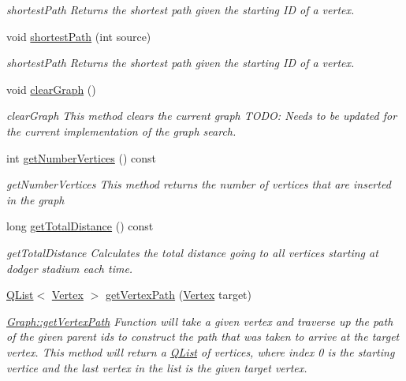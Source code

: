 \begin{DoxyCompactItemize}
\begin{DoxyCompactList}\small\item\em shortest\+Path Returns the shortest path given the starting ID of a vertex. \end{DoxyCompactList}\item 
void \hyperlink{class_graph_a6fc020710dd252058c006961f33f2b4b}{shortest\+Path} (int source)
\begin{DoxyCompactList}\small\item\em shortest\+Path Returns the shortest path given the starting ID of a vertex. \end{DoxyCompactList}\item 
void \hyperlink{class_graph_ad1c7af5ab7a9fc6ce190779170bb655c}{clear\+Graph} ()
\begin{DoxyCompactList}\small\item\em clear\+Graph This method clears the current graph T\+O\+DO\+: Needs to be updated for the current implementation of the graph search. \end{DoxyCompactList}\item 
int \hyperlink{class_graph_ae60b31b9a4779dee8145b4e66798dfbe}{get\+Number\+Vertices} () const 
\begin{DoxyCompactList}\small\item\em get\+Number\+Vertices This method returns the number of vertices that are inserted in the graph \end{DoxyCompactList}\item 
long \hyperlink{class_graph_ac855f8082b6b9931c065541c56086124}{get\+Total\+Distance} () const 
\begin{DoxyCompactList}\small\item\em get\+Total\+Distance Calculates the total distance going to all vertices starting at dodger stadium each time. \end{DoxyCompactList}\item 
\hyperlink{class_q_list}{Q\+List}$<$ \hyperlink{class_vertex}{Vertex} $>$ \hyperlink{class_graph_a09a9556b35c23b793429ba9433543a74}{get\+Vertex\+Path} (\hyperlink{class_vertex}{Vertex} target)
\begin{DoxyCompactList}\small\item\em \hyperlink{class_graph_a09a9556b35c23b793429ba9433543a74}{Graph\+::get\+Vertex\+Path} Function will take a given vertex and traverse up the path of the given parent ids to construct the path that was taken to arrive at the target vertex. This method will return a \hyperlink{class_q_list}{Q\+List} of vertices, where index 0 is the starting vertice and the last vertex in the list is the given target vertex. \end{DoxyCompactList}\item 

\end{DoxyCompactItemize}
